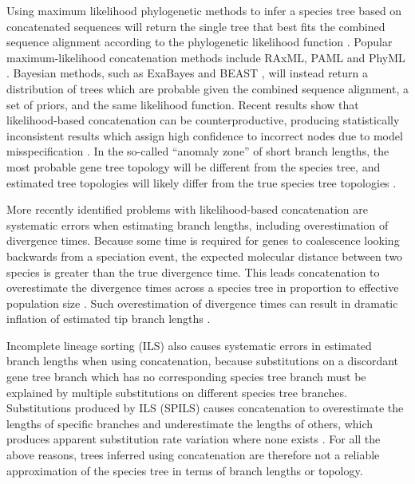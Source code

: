 \documentclass[nogrid]{MBE}%
\begin{document}
Using maximum likelihood phylogenetic methods to infer a species tree based on concatenated
sequences will return the single tree that
best fits the combined sequence alignment according to the phylogenetic likelihood function \citep{Felsenstein1981}. Popular maximum-likelihood concatenation methods include
RAxML, PAML and PhyML \citep{Stamatakis01052014,
Yang01082007,Guindon01052010}. Bayesian methods, such as ExaBayes and BEAST
\citep{Aberer01102014, Drummond2007}, will instead return a distribution of trees which are probable
given the combined sequence alignment, a set of priors, and the same likelihood function.
Recent results show that likelihood-based concatenation
can be counterproductive, producing statistically inconsistent results which assign
high confidence to incorrect nodes due to model misspecification
\citep{NYAS:NYAS12747}. In the so-called ``anomaly zone'' of short branch
lengths, the most probable gene tree topology will be different from the species
tree, and estimated tree topologies will likely differ from the true species
tree topologies \citep{journal.pgen.0020068, Kubatko01022007}.

More recently identified problems with likelihood-based concatenation are systematic errors when
estimating branch lengths, including overestimation of divergence times. Because
some time is required for genes to coalescence looking backwards from
a speciation event, the expected molecular distance between two species is
greater than the true divergence time. This leads concatenation to overestimate
the divergence times across a species tree in proportion to effective population size
\citep{doi:10.1146/annurev.ecolsys.33.010802.150500}. Such overestimation of divergence times can result in dramatic
inflation of estimated tip branch lengths \citep{Ogilvie01052016}.

Incomplete lineage sorting (ILS) also causes systematic errors in estimated
branch lengths when using concatenation, because substitutions on a discordant gene tree branch
which has no corresponding species tree branch must be explained by multiple
substitutions on different species tree branches. Substitutions
produced by ILS (SPILS) causes concatenation to overestimate the lengths of specific
branches and underestimate the lengths of others, which produces apparent
substitution rate variation where none exists \citep{Mendes01072016}. For all
the above reasons, trees
inferred using concatenation are therefore not a reliable approximation of the
species tree in terms of branch lengths or topology.
\end{document}
